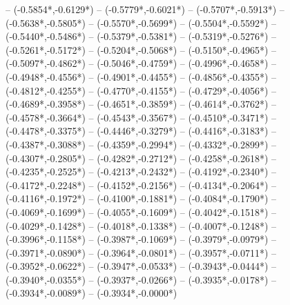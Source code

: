 {	-- ({-0.5854*\dx},{-0.6129*\dy})
	-- ({-0.5779*\dx},{-0.6021*\dy})
	-- ({-0.5707*\dx},{-0.5913*\dy})
	-- ({-0.5638*\dx},{-0.5805*\dy})
	-- ({-0.5570*\dx},{-0.5699*\dy})
	-- ({-0.5504*\dx},{-0.5592*\dy})
	-- ({-0.5440*\dx},{-0.5486*\dy})
	-- ({-0.5379*\dx},{-0.5381*\dy})
	-- ({-0.5319*\dx},{-0.5276*\dy})
	-- ({-0.5261*\dx},{-0.5172*\dy})
	-- ({-0.5204*\dx},{-0.5068*\dy})
	-- ({-0.5150*\dx},{-0.4965*\dy})
	-- ({-0.5097*\dx},{-0.4862*\dy})
	-- ({-0.5046*\dx},{-0.4759*\dy})
	-- ({-0.4996*\dx},{-0.4658*\dy})
	-- ({-0.4948*\dx},{-0.4556*\dy})
	-- ({-0.4901*\dx},{-0.4455*\dy})
	-- ({-0.4856*\dx},{-0.4355*\dy})
	-- ({-0.4812*\dx},{-0.4255*\dy})
	-- ({-0.4770*\dx},{-0.4155*\dy})
	-- ({-0.4729*\dx},{-0.4056*\dy})
	-- ({-0.4689*\dx},{-0.3958*\dy})
	-- ({-0.4651*\dx},{-0.3859*\dy})
	-- ({-0.4614*\dx},{-0.3762*\dy})
	-- ({-0.4578*\dx},{-0.3664*\dy})
	-- ({-0.4543*\dx},{-0.3567*\dy})
	-- ({-0.4510*\dx},{-0.3471*\dy})
	-- ({-0.4478*\dx},{-0.3375*\dy})
	-- ({-0.4446*\dx},{-0.3279*\dy})
	-- ({-0.4416*\dx},{-0.3183*\dy})
	-- ({-0.4387*\dx},{-0.3088*\dy})
	-- ({-0.4359*\dx},{-0.2994*\dy})
	-- ({-0.4332*\dx},{-0.2899*\dy})
	-- ({-0.4307*\dx},{-0.2805*\dy})
	-- ({-0.4282*\dx},{-0.2712*\dy})
	-- ({-0.4258*\dx},{-0.2618*\dy})
	-- ({-0.4235*\dx},{-0.2525*\dy})
	-- ({-0.4213*\dx},{-0.2432*\dy})
	-- ({-0.4192*\dx},{-0.2340*\dy})
	-- ({-0.4172*\dx},{-0.2248*\dy})
	-- ({-0.4152*\dx},{-0.2156*\dy})
	-- ({-0.4134*\dx},{-0.2064*\dy})
	-- ({-0.4116*\dx},{-0.1972*\dy})
	-- ({-0.4100*\dx},{-0.1881*\dy})
	-- ({-0.4084*\dx},{-0.1790*\dy})
	-- ({-0.4069*\dx},{-0.1699*\dy})
	-- ({-0.4055*\dx},{-0.1609*\dy})
	-- ({-0.4042*\dx},{-0.1518*\dy})
	-- ({-0.4029*\dx},{-0.1428*\dy})
	-- ({-0.4018*\dx},{-0.1338*\dy})
	-- ({-0.4007*\dx},{-0.1248*\dy})
	-- ({-0.3996*\dx},{-0.1158*\dy})
	-- ({-0.3987*\dx},{-0.1069*\dy})
	-- ({-0.3979*\dx},{-0.0979*\dy})
	-- ({-0.3971*\dx},{-0.0890*\dy})
	-- ({-0.3964*\dx},{-0.0801*\dy})
	-- ({-0.3957*\dx},{-0.0711*\dy})
	-- ({-0.3952*\dx},{-0.0622*\dy})
	-- ({-0.3947*\dx},{-0.0533*\dy})
	-- ({-0.3943*\dx},{-0.0444*\dy})
	-- ({-0.3940*\dx},{-0.0355*\dy})
	-- ({-0.3937*\dx},{-0.0266*\dy})
	-- ({-0.3935*\dx},{-0.0178*\dy})
	-- ({-0.3934*\dx},{-0.0089*\dy})
	-- ({-0.3934*\dx},{-0.0000*\dy})
}
